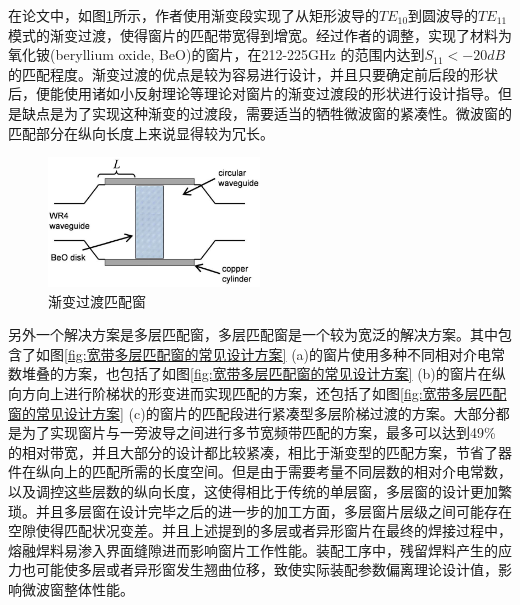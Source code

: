 \documentclass[master]{thesis-uestc}
\begin{document}
在论文\cite{cook_broadband_2013_gradually}中，如图\ref{fig:渐变过渡匹配窗}所示，作者使用渐变段实现了从矩形波导的$TE_{10}$到圆波导的$TE_{11}$模式的渐变过渡，使得窗片的匹配带宽得到增宽。经过作者的调整，实现了材料为氧化铍(beryllium oxide, BeO)的窗片，在212-225GHz 的范围内达到$S_{11}<-20dB$的匹配程度。渐变过渡的优点是较为容易进行设计，并且只要确定前后段的形状后，便能使用诸如小反射理论等理论对窗片的渐变过渡段的形状进行设计指导。但是缺点是为了实现这种渐变的过渡段，需要适当的牺牲微波窗的紧凑性。微波窗的匹配部分在纵向长度上来说显得较为冗长。
\begin{figure}[!htb]
    \centering
    \includegraphics[width=0.5\textwidth]{pic/chapter1/渐变过渡方案.png}
    \caption{渐变过渡匹配窗}
    \label{fig:渐变过渡匹配窗}
\end{figure}

另外一个解决方案是多层匹配窗，多层匹配窗是一个较为宽泛的解决方案。其中包含了如图\ref{fig:宽带多层匹配窗的常见设计方案} (a)的窗片使用多种不同相对介电常数堆叠的方案，也包括了如图\ref{fig:宽带多层匹配窗的常见设计方案} (b)的窗片在纵向方向上进行阶梯状的形变进而实现匹配的方案，还包括了如图\ref{fig:宽带多层匹配窗的常见设计方案} (c)的窗片的匹配段进行紧凑型多层阶梯过渡的方案。大部分都是为了实现窗片与一旁波导之间进行多节宽频带匹配的方案，最多可以达到49\% 的相对带宽，并且大部分的设计都比较紧凑，相比于渐变型的匹配方案，节省了器件在纵向上的匹配所需的长度空间。但是由于需要考量不同层数的相对介电常数，以及调控这些层数的纵向长度，这使得相比于传统的单层窗，多层窗的设计更加繁琐。并且多层窗在设计完毕之后的进一步的加工方面，多层窗片层级之间可能存在空隙使得匹配状况变差。并且上述提到的多层或者异形窗片在最终的焊接过程中，熔融焊料易渗入界面缝隙进而影响窗片工作性能。装配工序中，残留焊料产生的应力也可能使多层或者异形窗发生翘曲位移，致使实际装配参数偏离理论设计值，影响微波窗整体性能。
\end{document}
